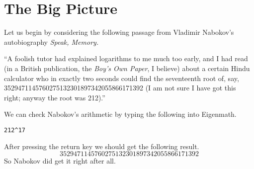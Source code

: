 \chapter{The Big Picture}
Let us begin by considering the following passage from Vladimir Nabokov's
autobiography {\it Speak, Memory.}

\medskip
\noindent
``A foolish tutor had explained logarithms to me much too early, and I had
read (in a British publication, the {\it Boy's Own Paper}, I believe)
about a certain Hindu calculator who in exactly two seconds could find the
seventeenth root of, say,
3529471145760275132301897342055866171392
(I am not sure I have got this right; anyway the root was 212).''

\medskip
\noindent
We can check Nabokov's arithmetic by typing the following into Eigenmath.

\medskip
\verb$212^17$

\medskip
\noindent
After pressing the return key we should get the following result.
$$3529471145760275132301897342055866171392$$
So Nabokov did get it right after all.

